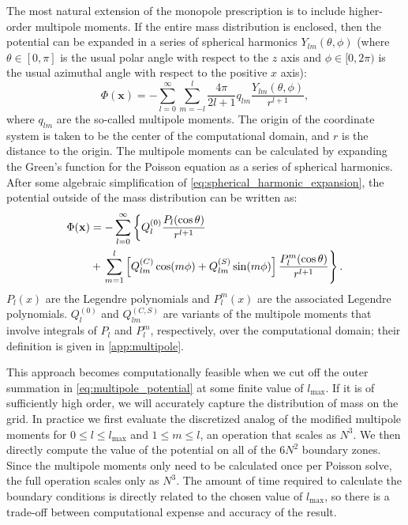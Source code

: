 \documentclass[12pt]{article}
\begin{document}
The most natural extension of the monopole prescription is to include
higher-order multipole moments. If the entire mass distribution is
enclosed, then the potential can be expanded in a series of spherical
harmonics $Y_{lm}(\theta,\phi)$ (where $\theta \in [0, \pi]$ is the usual polar angle
with respect to the $z$ axis and $\phi \in [0, 2\pi)$ is the usual azimuthal angle with
respect to the positive $x$ axis):
\begin{equation}
  \Phi(\mathbf{x}) = -\sum_{l=0}^{\infty}\sum_{m=-l}^{l} \frac{4\pi}{2l + 1} q_{lm} \frac{Y_{lm}(\theta,\phi)}{r^{l+1}}, \label{eq:spherical_harmonic_expansion}
\end{equation}
where $q_{lm}$ are the so-called multipole moments. The origin of the
coordinate system is taken to be the center of the computational
domain, and $r$ is the distance to the origin. The multipole moments
can be calculated by expanding the Green's function for the Poisson
equation as a series of spherical harmonics. After some algebraic
simplification of \autoref{eq:spherical_harmonic_expansion}, 
the potential outside of the mass distribution can be written as:
\begin{align}
  \Phi(\mathbf{x}) &= -\sum_{l=0}^{\infty} \left\{Q_l^{(0)} \frac{P_l(\text{cos}\, \theta)}{r^{l+1}} \right. \notag \\
    &+ \left. \sum_{m = 1}^{l}\left[ Q_{lm}^{(C)}\, \text{cos}(m\phi) + Q_{lm}^{(S)}\, \text{sin}(m\phi)\right] \frac{P_{l}^{m}(\text{cos}\, \theta)}{r^{l+1}} \right\}.\label{eq:multipole_potential}
\end{align}
$P_l(x)$ are the Legendre polynomials and $P_{l}^{m}(x)$ are the associated Legendre polynomials.
$Q_l^{(0)}$ and $Q_{lm}^{(C,S)}$ are variants of the multipole moments that involve integrals of
$P_l$ and $P_l^m$, respectively, over the computational domain; their definition is given in \autoref{app:multipole}.

This approach becomes computationally feasible when we cut off the
outer summation in \autoref{eq:multipole_potential} at some finite
value of $l_{\text{max}}$. If it is of sufficiently high order, we
will accurately capture the distribution of mass on the grid. In
practice we first evaluate the discretized analog of the modified
multipole moments for $0 \leq l \leq l_{\text{max}}$ and $1 \leq m
\leq l$, an operation that scales as $N^3$. We then directly compute
the value of the potential on all of the $6N^2$ boundary zones. Since
the multipole moments only need to be calculated once per Poisson
solve, the full operation scales only as $N^3$. The amount of time
required to calculate the boundary conditions is directly related
to the chosen value of $l_{\text{max}}$, so there is a trade-off
between computational expense and accuracy of the result.
\end{document}

